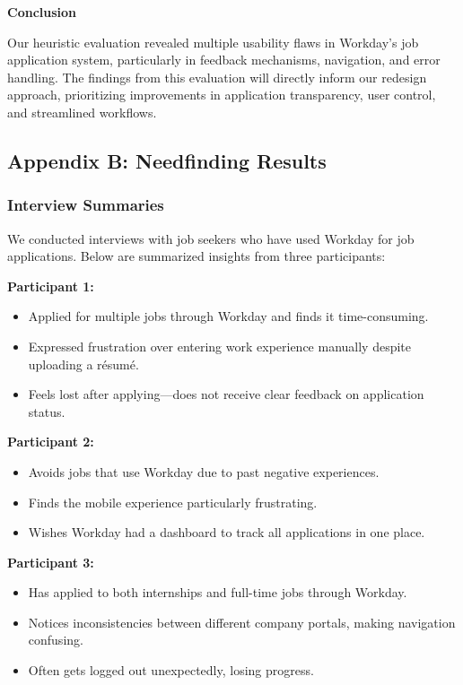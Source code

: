 \documentclass[
	letterpaper, %
]{jdf}
\begin{document}
\textbf{Conclusion}  

Our heuristic evaluation revealed multiple usability flaws in Workday’s job application system, particularly in feedback mechanisms, navigation, and error handling. The findings from this evaluation will directly inform our redesign approach, prioritizing improvements in application transparency, user control, and streamlined workflows.

\newpage

\subsection{Appendix B: Needfinding Results}

\subsubsection*{Interview Summaries}  

We conducted interviews with job seekers who have used Workday for job applications. Below are summarized insights from three participants:  

\textbf{Participant 1:}  
\begin{itemize}  
    \item Applied for multiple jobs through Workday and finds it time-consuming.  
    \item Expressed frustration over entering work experience manually despite uploading a résumé.  
    \item Feels lost after applying—does not receive clear feedback on application status.  
\end{itemize}  

\textbf{Participant 2:}  
\begin{itemize}  
    \item Avoids jobs that use Workday due to past negative experiences.  
    \item Finds the mobile experience particularly frustrating.  
    \item Wishes Workday had a dashboard to track all applications in one place.  
\end{itemize}  

\textbf{Participant 3:}  
\begin{itemize}  
    \item Has applied to both internships and full-time jobs through Workday.  
    \item Notices inconsistencies between different company portals, making navigation confusing.  
    \item Often gets logged out unexpectedly, losing progress.  
\end{itemize}  
\hfill \break  
\end{document}
